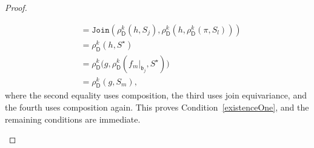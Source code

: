 \documentclass[10pt,a4paper]{amsart}
\newcommand{\abag}{\mathfrak{b}}
\newcommand{\action}{\rho}
\newcommand{\dpcore}{\mathsf{D}}
\newcommand{\jointype}{\mathtt{Join}}
\newcommand{\relabelingfunction}{f}
\newcommand{\treewidthvalue}{k}
\newcommand{\witnessset}{S}
\begin{document}
\begin{proof}
\begin{enumerate}
\[\begin{aligned}
&= \jointype(\action_{\dpcore}^{\treewidthvalue}(h,\witnessset_j),\action_{\dpcore}^{\treewidthvalue}(h,\action_{\dpcore}^{\treewidthvalue}(\pi,\witnessset_l)))\\
&= \action_{\dpcore}^{\treewidthvalue}(h,S^\star)\\
&= \action_{\dpcore}^{\treewidthvalue}\bigl(g,\action_{\dpcore}^{\treewidthvalue}(\relabelingfunction_m|_{\abag_j},S^\star)\bigr)\\
&= \action_{\dpcore}^{\treewidthvalue}(g,\witnessset_m),
\end{aligned}
\]
where the second equality uses composition, the third uses join equivariance, and the fourth uses composition again. This proves Condition~\ref{existenceOne}, and the remaining conditions are immediate.
\end{enumerate}
\end{proof}
\end{document}
